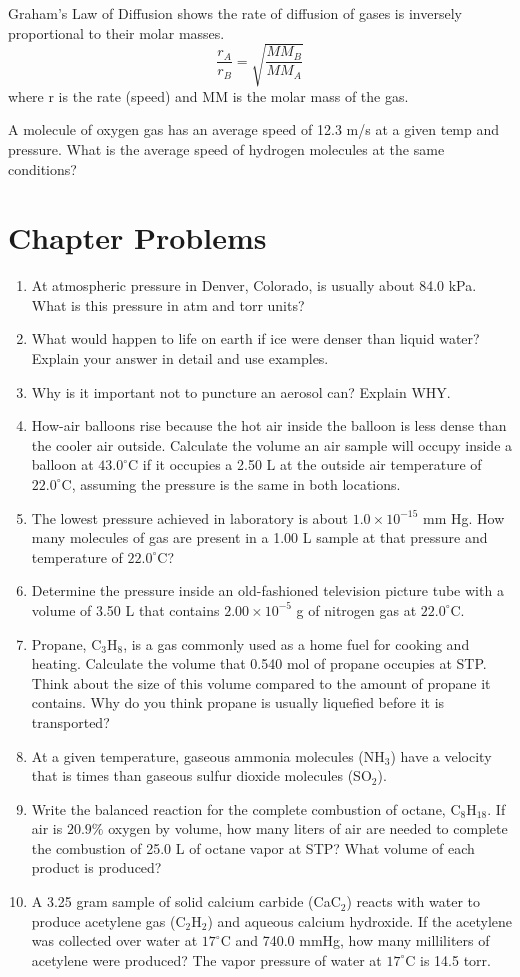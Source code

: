\documentclass[../hchem.tex]{subfiles}
\begin{document}
Graham's Law of Diffusion shows the rate of diffusion of gases is inversely proportional to their molar masses.
\[\frac{r_A}{r_B}=\sqrt{\frac{MM_B}{MM_A}}\]
where r is the rate (speed) and MM is the molar mass of the gas.

\ex A molecule of oxygen gas has an average speed of 12.3 m/s at a given temp and pressure. What is the 
average speed of hydrogen molecules at the same conditions? 

\section*{Chapter Problems}
\begin{enumerate}
    \item At atmospheric pressure in Denver, Colorado, is usually about 84.0 kPa. What is this pressure in atm and torr units?
    \item What would happen to life on earth if ice were denser than liquid water? Explain your answer in detail and use examples.
    \item Why is it important not to puncture an aerosol can? Explain WHY.
    \item How-air balloons rise because the hot air inside the balloon is less dense than the cooler air outside. Calculate the volume an air sample will occupy inside a balloon at $43.0^{\circ}$C if it occupies a 2.50 L at the outside air temperature of $22.0^{\circ}$C, assuming the pressure is the same in both locations.
    \item The lowest pressure achieved in laboratory is about $1.0\times 10^{-15}$ mm Hg. How many molecules of gas are present in a 1.00 L sample at that pressure and temperature of $22.0^{\circ}$C?
    \item Determine the pressure inside an old-fashioned television picture tube with a volume of 3.50 L that contains $2.00\times 10^{-5}$ g of nitrogen gas at $22.0^{\circ}$C.
    \item Propane, C$_3$H$_8$, is a gas commonly used as a home fuel for cooking and heating. Calculate the volume that 0.540 mol of propane occupies at STP. Think about the size of this volume compared to the amount of propane it contains. Why do you think propane is usually liquefied before it is transported?
    \item At a given temperature, gaseous ammonia molecules (NH$_3$) have a velocity that is \blank times \blank than gaseous sulfur dioxide molecules (SO$_2$).
    \item Write the balanced reaction for the complete combustion of octane, C$_8$H$_{18}$. If air is $20.9\%$ oxygen by volume, how many liters of air are needed to complete the combustion of 25.0 L of octane vapor at STP? What volume of each product is produced?
    \item A 3.25 gram sample of solid calcium carbide (CaC$_2$) reacts with water to produce acetylene gas (C$_2$H$_2$) and aqueous calcium hydroxide. If the acetylene was collected over water at $17^{\circ}$C and 740.0 mmHg, how many milliliters of acetylene were produced? The vapor pressure of water at $17^{\circ}$C is 14.5 torr. 
\end{enumerate}
\end{document}
